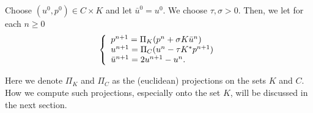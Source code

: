 

	

		\begin{algorithm}\label{alg:primal_dual_cremers}
            Choose $(u^{0}, p^{0}) \in C \times K$ and let $\bar{u}^{0} = u^{0}$. We choose $\tau, \sigma > 0$. Then, we let for each $n \ge 0$
                \begin{equation}
                    \left\{ 
                        \begin{array}{l l}
                          p^{n+1} = \Pi_{K} (p^{n} + \sigma K \bar{u}^{n}) \\
                          u^{n+1} = \Pi_{C} (u^{n} - \tau K^{*} p^{n+1}) \\
                          \bar{u}^{n+1} = 2u^{n+1} - u^{n}.
                        \end{array}
                    \right.
                \end{equation}
        \end{algorithm}

    Here we denote $\Pi_{K}$ and $\Pi_{C}$ as the (euclidean) projections on the sets $K$ and $C$. How we compute such projections, especially onto the set $K$, will be discussed in the next section.
    

